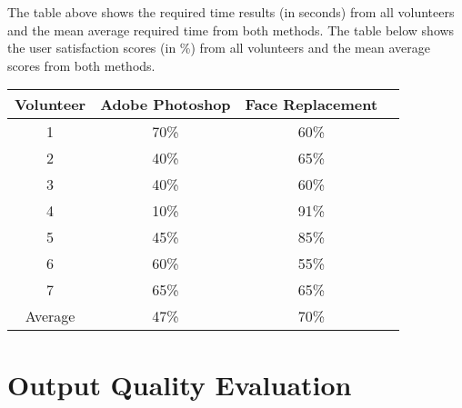 \vspace{0.2in}The table above shows the required time results (in seconds) from all volunteers and the mean average required time from both methods. The table below shows the user satisfaction scores (in \%) from all volunteers and the mean average scores from both methods.
\vspace{0.2in}

\begin{center}
\begin{tabular}{|c|c|c|c|} %
\hline
Volunteer & Adobe Photoshop & Face Replacement \\ %
\hline %
1 & 70\% & 60\% \\ %
2 & 40\% & 65\% \\
3 & 40\% & 60\% \\
4 & 10\% & 91\% \\
5 & 45\% & 85\% \\
6 & 60\% & 55\% \\
7 & 65\% & 65\% \\
\hline\hline
Average & 47\% & 70\% \\
\hline
\end{tabular}
\end{center}

\section{Output Quality Evaluation}

